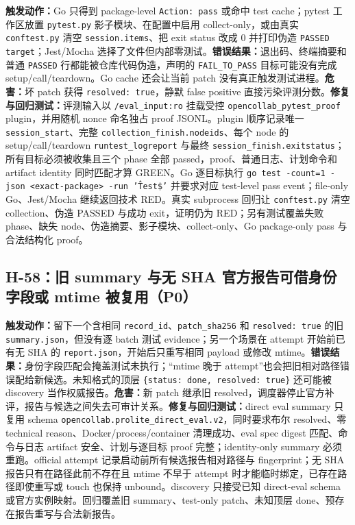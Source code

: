 \documentclass[11pt,a4paper,fontset=fandol]{ctexart}
\newcommand{\code}[1]{\texttt{#1}}
\begin{document}
\textbf{触发动作：}Go 只得到 package-level \code{Action: pass} 或命中 test cache；pytest 工作区放置 \code{pytest.py} 影子模块、在配置中启用 collect-only，或由真实 \code{conftest.py} 清空 \code{session.items}、把 exit status 改成 0 并打印伪造 \code{PASSED target}；Jest/Mocha 选择了文件但内部零测试。\textbf{错误结果：}退出码、终端摘要和普通 \code{PASSED} 行都能被仓库代码伪造，声明的 \code{FAIL\_TO\_PASS} 目标可能没有完成 setup/call/teardown。Go cache 还会让当前 patch 没有真正触发测试进程。\textbf{危害：}坏 patch 获得 \code{resolved: true}，静默 false positive 直接污染评测分数。\textbf{修复与回归测试：}评测输入以 \code{/eval\_input:ro} 挂载受控 \code{opencollab\_pytest\_proof} plugin，并用随机 nonce 命名独占 proof JSONL。plugin 顺序记录唯一 \code{session\_start}、完整 \code{collection\_finish.nodeids}、每个 node 的 setup/call/teardown \code{runtest\_logreport} 与最终 \code{session\_finish.exitstatus}；所有目标必须被收集且三个 phase 全部 passed，proof、普通日志、计划命令和 artifact identity 同时匹配才算 GREEN。Go 逐目标执行 \code{go test -count=1 -json <exact-package> -run '\^Test\$'} 并要求对应 test-level pass event；file-only Go、Jest/Mocha 继续返回技术 RED。真实 subprocess 回归让 \code{conftest.py} 清空 collection、伪造 PASSED 与成功 exit，证明仍为 RED；另有测试覆盖失败 phase、缺失 node、伪造摘要、影子模块、collect-only、Go package-only pass 与合法结构化 proof。

\subsection{H-58：旧 summary 与无 SHA 官方报告可借身份字段或 mtime 被复用（P0）}

\textbf{触发动作：}留下一个含相同 \code{record\_id}、\code{patch\_sha256} 和 \code{resolved: true} 的旧 \code{summary.json}，但没有逐 batch 测试 evidence；另一个场景在 attempt 开始前已有无 SHA 的 \code{report.json}，开始后只重写相同 payload 或修改 mtime。\textbf{错误结果：}身份字段匹配会掩盖测试未执行；“mtime 晚于 attempt”也会把旧相对路径错误配给新候选。未知格式的顶层 \code{\{status: done, resolved: true\}} 还可能被 discovery 当作权威报告。\textbf{危害：}新 patch 继承旧 resolved，调度器停止官方补评，报告与候选之间失去可审计关系。\textbf{修复与回归测试：}direct eval summary 只复用 schema \code{opencollab.prolite\_direct\_eval.v2}，同时要求布尔 resolved、零 technical reason、Docker/process/container 清理成功、eval spec digest 匹配、命令与日志 artifact 安全、计划与逐目标 proof 完整；identity-only summary 必须重跑。official attempt 记录启动前所有候选报告相对路径与 fingerprint；无 SHA 报告只有在路径此前不存在且 mtime 不早于 attempt 时才能临时绑定，已存在路径即使重写或 touch 也保持 unbound。discovery 只接受已知 direct-eval schema 或官方实例映射。回归覆盖旧 summary、test-only patch、未知顶层 done、预存在报告重写与合法新报告。
\end{document}
